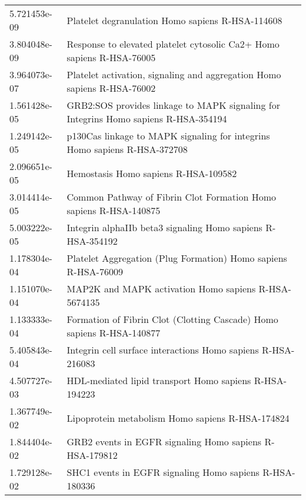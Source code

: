 \begin{longtable}{p{2.4cm}p{14.5cm}}
\bottomrule
\endlastfoot
             5.721453e-09 &                                              Platelet degranulation Homo sapiens R-HSA-114608 \\
             3.804048e-09 &                         Response to elevated platelet cytosolic Ca2+ Homo sapiens R-HSA-76005 \\
             3.964073e-07 &                       Platelet activation, signaling and aggregation Homo sapiens R-HSA-76002 \\
             1.561428e-05 &           GRB2:SOS provides linkage to MAPK signaling for Integrins Homo sapiens R-HSA-354194 \\
             1.249142e-05 &                     p130Cas linkage to MAPK signaling for integrins Homo sapiens R-HSA-372708 \\
             2.096651e-05 &                                                          Hemostasis Homo sapiens R-HSA-109582 \\
             3.014414e-05 &                             Common Pathway of Fibrin Clot Formation Homo sapiens R-HSA-140875 \\
             5.003222e-05 &                                   Integrin alphaIIb beta3 signaling Homo sapiens R-HSA-354192 \\
             1.178304e-04 &                                Platelet Aggregation (Plug Formation) Homo sapiens R-HSA-76009 \\
             1.151070e-04 &                                          MAP2K and MAPK activation Homo sapiens R-HSA-5674135 \\
             1.133333e-04 &                         Formation of Fibrin Clot (Clotting Cascade) Homo sapiens R-HSA-140877 \\
             5.405843e-04 &                                  Integrin cell surface interactions Homo sapiens R-HSA-216083 \\
             4.507727e-03 &                                        HDL-mediated lipid transport Homo sapiens R-HSA-194223 \\
             1.367749e-02 &                                              Lipoprotein metabolism Homo sapiens R-HSA-174824 \\
             1.844404e-02 &                                       GRB2 events in EGFR signaling Homo sapiens R-HSA-179812 \\
             1.729128e-02 &                                       SHC1 events in EGFR signaling Homo sapiens R-HSA-180336 \\

\end{longtable}
